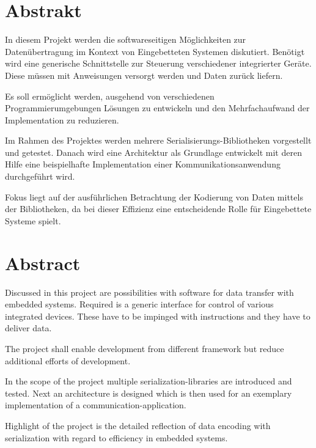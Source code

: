 \section*{Abstrakt}
In diesem Projekt werden die softwareseitigen Möglichkeiten zur Datenübertragung im Kontext von Eingebetteten Systemen diskutiert. Benötigt wird eine generische Schnittstelle zur Steuerung verschiedener integrierter Geräte. Diese müssen mit Anweisungen versorgt werden und Daten zurück liefern.

Es soll ermöglicht werden, ausgehend von verschiedenen Programmierumgebungen Lösungen zu entwickeln und den Mehrfachaufwand der Implementation zu reduzieren.

Im Rahmen des Projektes werden mehrere Serialisierungs-Bibliotheken vorgestellt und getestet. Danach wird eine Architektur als Grundlage entwickelt mit deren Hilfe eine beispielhafte Implementation einer Kommunikationsanwendung durchgeführt wird.

Fokus liegt auf der ausführlichen Betrachtung der Kodierung von Daten mittels der Bibliotheken, da bei dieser Effizienz eine entscheidende Rolle für Eingebettete Systeme spielt.

\section*{Abstract}
Discussed in this project are possibilities with software for data transfer with embedded systems. Required is a generic interface for control of various integrated devices. These have to be impinged with instructions and they have to deliver data.

The project shall enable development from different framework but reduce additional efforts of development.

In the scope of the project multiple serialization-libraries are introduced and tested. Next an architecture is designed which is then used for an exemplary implementation of a communication-application.

Highlight of the project is the detailed reflection of data encoding with serialization with regard to efficiency in embedded systems.
